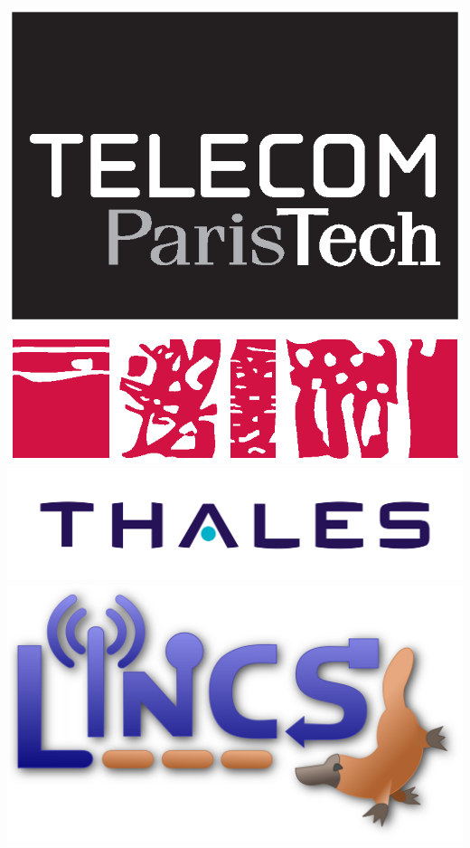 

\thispagestyle{empty}

\includegraphics[scale=0.2]{img/logos/telecom.eps}
\includegraphics[scale=0.2]{img/logos/thales.jpg}
\includegraphics[scale=0.12]{img/logos/lincs_pupuce.png}

